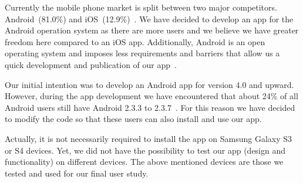\begin{description}[leftmargin=0cm]
	\item[Android:] Currently the mobile phone market is split between two major competitors. Android~(81.0\%) and iOS~(12.9\%)~\cite{androidiosmarketshare}. 
	We have decided to develop an app for the Android operation system as there are more users and we believe we have greater freedom here compared to an iOS app. 
 	Additionally, Android is an open operating system and imposes less requirements and barriers that allow us a quick development and publication of our app~\cite{publishios, publishandroid}. 
	\item[Version:] Our initial intention was to develop an Android app for version 4.0 and upward.
 However, during the app development we have encountered that about 24\% of all Android users still have Android 2.3.3 to 2.3.7~\cite{versionsandroid}. For this reason we have decided to modify the code so that these users can also install and use our app.
	\item[Samsung Galaxy S3 or S4:] Actually, it is not necessarily required to install the app on Samsung Galaxy S3 or S4 devices. 
Yet, we did not have the possibility to test our app (design and functionality) on different devices.
The above mentioned devices are those we tested and used for our final user study.
\end{description}

